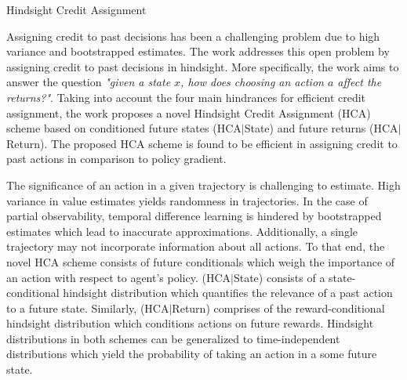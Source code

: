 \documentclass[11pt,letterpaper]{article}
\begin{document}
\begin{center}
  \large{Hindsight Credit Assignment}
\end{center}

Assigning credit to past decisions has been a challenging problem due to high variance and bootstrapped estimates. The work addresses this open problem by assigning credit to past decisions in hindsight. More specifically, the work aims to answer the question \textit{"given a state $x$, how does choosing an action $a$ affect the returns?"}. Taking into account the four main hindrances for efficient credit assignment, the work proposes a novel Hindsight Credit Assignment (HCA) scheme based on conditioned future states (HCA$|$State) and future returns (HCA$|$Return). The proposed HCA scheme is found to be efficient in assigning credit to past actions in comparison to policy gradient.

The significance of an action in a given trajectory is challenging to estimate. High variance in value estimates yields randomness in trajectories. In the case of partial observability, temporal difference learning is hindered by bootstrapped estimates which lead to inaccurate approximations. Additionally, a single trajectory may not incorporate information about all actions. To that end, the novel HCA scheme consists of future conditionals which weigh the importance of an action with respect to agent's policy. (HCA$|$State) consists of a state-conditional hindsight distribution which quantifies the relevance of a past action to a future state. Similarly, (HCA$|$Return) comprises of the reward-conditional hindsight distribution which conditions actions on future rewards. Hindsight distributions in both schemes can be generalized to time-independent distributions which yield the probability of taking an action in a some future state.   
\end{document}

